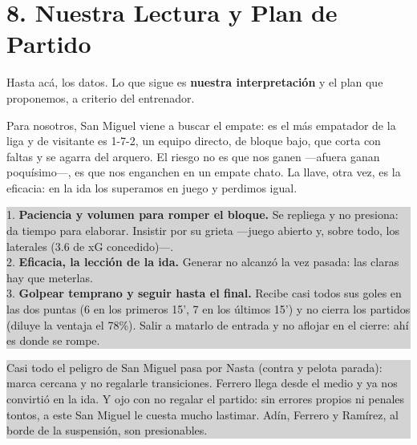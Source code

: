 \documentclass[11pt, a4paper]{article}
\newcommand{\alertbox}[2]{%
  \noindent\colorbox{lightgray}{%
    \parbox{\dimexpr\textwidth-2\fboxsep\relax}{%
      \raggedright\smallskip
      \textbf{\color{alertred}{#1}}\par\smallskip
      \small #2\par\smallskip}}%
  \par\vspace{3mm}}
\newcommand{\successbox}[2]{%
  \noindent\colorbox{lightgray}{%
    \parbox{\dimexpr\textwidth-2\fboxsep\relax}{%
      \raggedright\smallskip
      \textbf{\color{accentgreen}{#1}}\par\smallskip
      \small #2\par\smallskip}}%
  \par\vspace{3mm}}
\begin{document}
\section*{8. Nuestra Lectura y Plan de Partido}

Hasta acá, los datos. Lo que sigue es \textbf{nuestra interpretación} y el plan que proponemos, a criterio del entrenador.

Para nosotros, San Miguel viene a buscar el empate: es el más empatador de la liga y de visitante es 1-7-2, un equipo directo, de bloque bajo, que corta con faltas y se agarra del arquero. El riesgo no es que nos ganen —afuera ganan poquísimo—, es que nos enganchen en un empate chato. La llave, otra vez, es la eficacia: en la ida los superamos en juego y perdimos igual.

\successbox{Las tres claves, a nuestro criterio}{
  1. \textbf{Paciencia y volumen para romper el bloque.} Se repliega y no presiona: da tiempo para elaborar. Insistir por su grieta —juego abierto y, sobre todo, los laterales (3.6 de xG concedido)—. \\[1mm]
  2. \textbf{Eficacia, la lección de la ida.} Generar no alcanzó la vez pasada: las claras hay que meterlas. \\[1mm]
  3. \textbf{Golpear temprano y seguir hasta el final.} Recibe casi todos sus goles en las dos puntas (6 en los primeros 15', 7 en los últimos 15') y no cierra los partidos (diluye la ventaja el 78\%). Salir a matarlo de entrada y no aflojar en el cierre: ahí es donde se rompe.
}

\alertbox{Lo que hay que cuidar}{Casi todo el peligro de San Miguel pasa por Nasta (contra y pelota parada): marca cercana y no regalarle transiciones. Ferrero llega desde el medio y ya nos convirtió en la ida. Y ojo con no regalar el partido: sin errores propios ni penales tontos, a este San Miguel le cuesta mucho lastimar. Adín, Ferrero y Ramírez, al borde de la suspensión, son presionables.}
\end{document}
